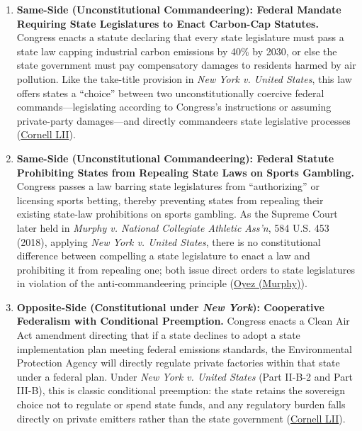 \documentclass[12pt]{article}
\begin{document}
\begin{enumerate}
    \item \textbf{Same-Side (Unconstitutional Commandeering): Federal Mandate Requiring State Legislatures to Enact Carbon-Cap Statutes.} Congress enacts a statute declaring that every state legislature must pass a state law capping industrial carbon emissions by 40\% by 2030, or else the state government must pay compensatory damages to residents harmed by air pollution. Like the take-title provision in \textit{New York v. United States}, this law offers states a ``choice'' between two unconstitutionally coercive federal commands---legislating according to Congress's instructions or assuming private-party damages---and directly commandeers state legislative processes (\href{https://www.law.cornell.edu/supremecourt/text/505/144}{Cornell LII}).

    \item \textbf{Same-Side (Unconstitutional Commandeering): Federal Statute Prohibiting States from Repealing State Laws on Sports Gambling.} Congress passes a law barring state legislatures from ``authorizing'' or licensing sports betting, thereby preventing states from repealing their existing state-law prohibitions on sports gambling. As the Supreme Court later held in \textit{Murphy v. National Collegiate Athletic Ass'n}, 584 U.S. 453 (2018), applying \textit{New York v. United States}, there is no constitutional difference between compelling a state legislature to enact a law and prohibiting it from repealing one; both issue direct orders to state legislatures in violation of the anti-commandeering principle (\href{https://www.oyez.org/cases/2017/16-476}{Oyez (Murphy)}).

    \item \textbf{Opposite-Side (Constitutional under \textit{New York}): Cooperative Federalism with Conditional Preemption.} Congress enacts a Clean Air Act amendment directing that if a state declines to adopt a state implementation plan meeting federal emissions standards, the Environmental Protection Agency will directly regulate private factories within that state under a federal plan. Under \textit{New York v. United States} (Part II-B-2 and Part III-B), this is classic conditional preemption: the state retains the sovereign choice not to regulate or spend state funds, and any regulatory burden falls directly on private emitters rather than the state government (\href{https://www.law.cornell.edu/supremecourt/text/505/144}{Cornell LII}).


\end{enumerate}
\end{document}
